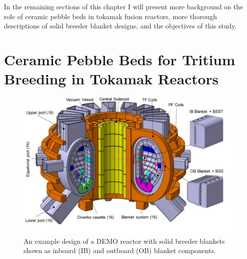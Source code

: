 In the remaining sections of this chapter I will present more background on the role of ceramic pebble beds in tokamak fusion reactors, more thorough descriptions of solid breeder blanket designs, and the objectives of this study.


















\section{Ceramic Pebble Beds for Tritium Breeding in Tokamak Reactors}
\begin{figure}[ht]
	\centering
	\includegraphics[width=\singleimagewidth]{figures/demo} 
	\caption{An example design of a DEMO reactor with solid breeder blankets shown as inboard (IB) and outboard (OB) blanket components.}
	\label{fig:demo}
\end{figure}

